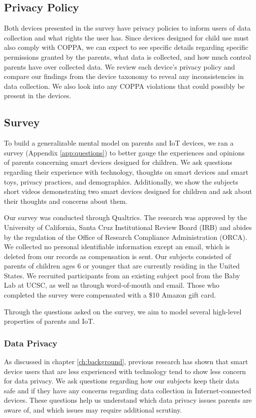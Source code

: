 \documentclass[12pt]{ucthesis}
\begin{document}
\subsection{Privacy Policy}
Both devices presented in the survey have privacy policies to inform users of data collection and what rights the user has. Since devices designed for child use must also comply with COPPA, we can expect to see specific details regarding specific permissions granted by the parents, what data is collected, and how much control parents have over collected data. We review each device's privacy policy and compare our findings from the device taxonomy to reveal any inconsistencies in data collection. We also look into any COPPA violations that could possibly be present in the devices.

\subsection{Survey}
To build a generalizable mental model on parents and IoT devices, we ran a survey (Appendix \ref{app:questions}) to better gauge the experiences and opinions of parents concerning smart devices designed for children. We ask questions regarding their experience with technology, thoughts on smart devices and smart toys, privacy practices, and demographics. Additionally, we show the subjects short videos demonstrating two smart devices designed for children and ask about their thoughts and concerns about them. 

Our survey was conducted through Qualtrics. The research was approved by the University of California, Santa Cruz Institutional Review Board (IRB) and abides by the regulation of the Office of Research Compliance Administration (ORCA). We collected no personal identifiable information except an email, which is deleted from our records as compensation is sent. Our subjects consisted of parents of children ages 6 or younger that are currently residing in the United States. We recruited participants from an existing subject pool from the Baby Lab at UCSC, as well as through word-of-mouth and email. Those who completed the survey were compensated with a \$10 Amazon gift card.

Through the questions asked on the survey, we aim to model several high-level properties of parents and IoT.

\subsubsection{Data Privacy}
As discussed in chapter \ref{ch:background}, previous research has shown that smart device users that are less experienced with technology tend to show less concern for data privacy. We ask questions regarding how our subjects keep their data safe and if they have any concerns regarding data collection in Internet-connected devices. These questions help us understand which data privacy issues parents are aware of, and which issues may require additional scrutiny.
\end{document}
